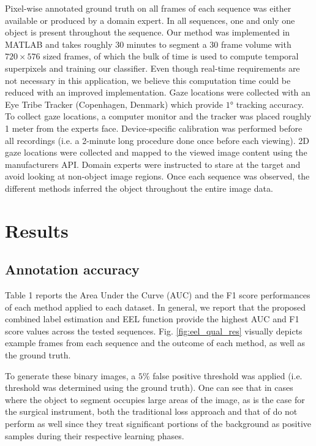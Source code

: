 Pixel-wise annotated ground truth
on all frames of each sequence was either available or produced by a domain expert.
In all sequences, one and only one object is present throughout the sequence.
Our method was implemented in MATLAB and takes roughly 30 minutes to segment a
30 frame volume with $720 \times 576$ sized frames, of which the bulk of time is used to compute
temporal superpixels and training our classifier.
Even though real-time requirements are not necessary in this application, we believe this computation time could be reduced with an improved implementation.
Gaze locations were collected with an Eye Tribe Tracker (Copenhagen, Denmark) which provide
$\ang{1}$ tracking accuracy.
To collect gaze locations, a computer monitor and the tracker
was placed roughly 1 meter from the experts face.
Device-specific calibration was performed before all recordings (i.e. a 2-minute long procedure done once before each viewing).
2D gaze locations were collected and mapped to the viewed image content using the manufacturers API.
Domain experts were instructed to stare at the target and avoid looking at non-object image
regions.
Once each sequence was observed, the different methods inferred the object throughout
the entire image data.

\section{Results}
\subsection{Annotation accuracy}
Table 1 reports the Area Under the Curve (AUC) and the F1 score performances of each method applied to each dataset.
In general, we report that the proposed combined label estimation and EEL function provide the highest AUC and F1 score values across the tested sequences.
Fig. \ref{fig:eel_qual_res} visually depicts example frames from each sequence and the outcome of each method, as well as the ground truth.

To generate these binary images, a $5\%$ false positive threshold was applied (i.e. threshold was determined using the ground truth).
One can see that in cases where the object to segment occupies large areas of the image,
as is the case for the surgical instrument, both the traditional loss approach and that of \cite{vilarino07} do not perform as well since they treat significant portions of the background as positive samples during their respective learning phases.

